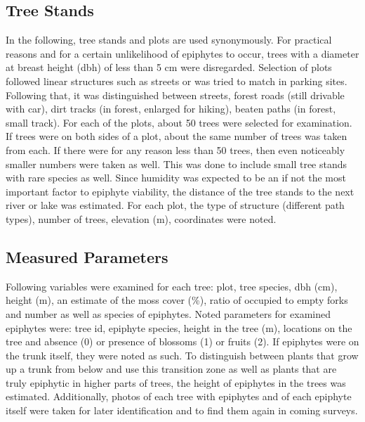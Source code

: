 \documentclass[12pt, a4paper, oneside, draft]{scrartcl}
\begin{document}
	\subsection{Tree Stands}
	In the following, tree stands and plots are used synonymously. For practical reasons and for a certain unlikelihood of epiphytes to occur, trees with a diameter at breast height (dbh) of less than 5 cm were disregarded. Selection of plots followed linear structures such as streets or was tried to match in parking sites. Following that, it was distinguished between streets, forest roads (still drivable with car), dirt tracks (in forest, enlarged for hiking), beaten paths (in forest, small track). For each of the plots, about 50 trees were selected for examination. If trees were on both sides of a plot, about the same number of trees was taken from each. If there were for any reason less than 50 trees, then even noticeably smaller numbers were taken as well. This was done to include small tree stands with rare species as well. Since humidity was expected to be an if not the most important factor to epiphyte viability, the distance of the tree stands to the next river or lake was estimated. For each plot, the type of structure (different path types), number of trees, elevation (m), coordinates were noted.
	
	\subsection{Measured Parameters}
	Following variables were examined for each tree: plot, tree species, dbh (cm), height (m), an estimate of the moss cover (\%), ratio of occupied to empty forks and number as well as species of epiphytes. Noted parameters for examined epiphytes were: tree id, epiphyte species, height in the tree (m), locations on the tree  and absence (0) or presence of blossoms (1) or fruits (2). If epiphytes were on the trunk itself, they were noted as such. To distinguish between plants that grow up a trunk from below and use this transition zone as well as plants that are truly epiphytic in higher parts of trees, the height of epiphytes in the trees was estimated. Additionally, photos of each tree with epiphytes and of each epiphyte itself were taken for later identification and to find them again in coming surveys.
	
\end{document}
